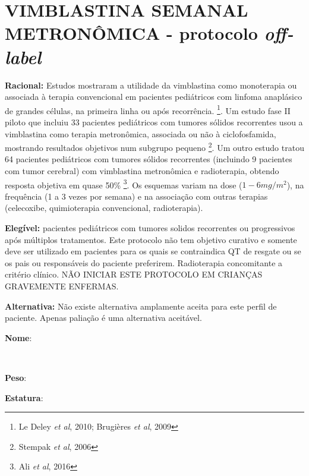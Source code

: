 \documentclass[11pt,a4paper,oldfontcommands]{memoir}
\def\entrywithlabel[#1]#2{\parbox{#1}{{\small #2:} \hrulefill}}
\begin{document}
\section{VIMBLASTINA SEMANAL METRONÔMICA - protocolo \textit{off-label}}
{\let\thefootnote\relax{}}
\textbf{Racional:} Estudos mostraram a utilidade da vimblastina como monoterapia ou associada à terapia convencional em pacientes pediátricos com linfoma anaplásico de grandes células, na primeira linha ou após recorrência.  \footnote{Le Deley \textit{et al}, 2010; Brugières \textit{et al}, 2009}. Um estudo fase II piloto que incluiu 33 pacientes pediátricos com tumores sólidos recorrentes usou a vimblastina como terapia metronômica, associada ou não à ciclofosfamida, mostrando resultados objetivos num subgrupo pequeno \footnote{Stempak \textit{et al}, 2006}. Um outro estudo tratou 64 pacientes pediátricos com tumores sólidos recorrentes (incluindo 9 pacientes com tumor cerebral) com vimblastina metronômica e radioterapia, obtendo resposta objetiva em quase 50\% \footnote{Ali \textit{et al}, 2016}. Os esquemas variam na dose ($1-6 mg/m^2$), na frequência (1 a 3 vezes por semana) e na associação com outras terapias (celecoxibe, quimioterapia convencional, radioterapia). 

\textbf{Elegível:} pacientes pediátricos com tumores solidos recorrentes ou progressivos após múltiplos tratamentos. Este protocolo não tem objetivo curativo e somente deve ser utilizado em pacientes para os quais se contraindica QT de resgate ou se os pais ou responsáveis do paciente preferirem. Radioterapia concomitante a critério clínico. NÃO INICIAR ESTE PROTOCOLO EM CRIANÇAS GRAVEMENTE ENFERMAS.

\textbf{Alternativa:}  Não existe alternativa amplamente aceita para este perfil de paciente. Apenas paliação é uma alternativa aceitável.
\\[0.4cm]
\entrywithlabel[1\hsize]{\textbf{Nome}}\hfill
\\[0.3cm]
\entrywithlabel[.45\hsize]{\textbf{Peso}}\hfill  \entrywithlabel[.45\hsize]{\textbf{Estatura}}
\end{document}
